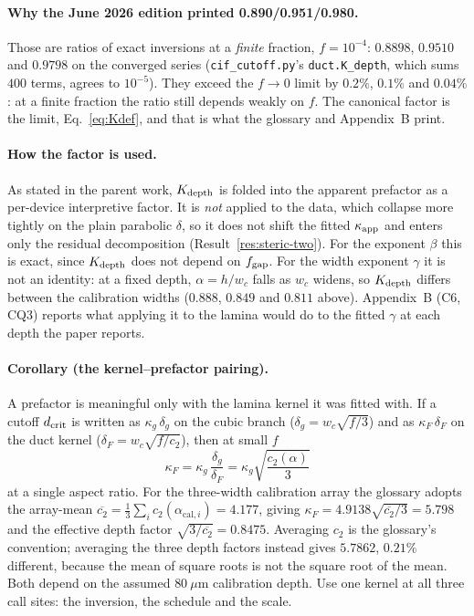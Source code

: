 \paragraph{Why the June 2026 edition printed 0.890/0.951/0.980.} Those are ratios of exact
inversions at a \emph{finite} fraction, $f=10^{-4}$: $0.8898$, $0.9510$ and $0.9798$ on the
converged series (\texttt{cif\_cutoff.py}'s \texttt{duct.K\_depth}, which sums $400$ terms, agrees
to $10^{-5}$). They exceed the $f\to0$ limit by $0.2\%$, $0.1\%$ and $0.04\%$: at a finite
fraction the ratio still depends weakly on $f$. The canonical
factor is the limit, Eq.~\eqref{eq:Kdef}, and that is what the glossary and Appendix~B print.

\paragraph{How the factor is used.} As stated in the parent work, $K_{\mathrm{depth}}$ is folded into the
apparent prefactor as a per-device interpretive factor. It is \emph{not} applied to the data,
which collapse more tightly on the plain parabolic $\delta$, so it does not shift the fitted
$\kappa_{\mathrm{app}}$ and enters only the residual decomposition (Result~\ref{res:steric-two}). For the
exponent $\beta$ this is exact, since $K_{\mathrm{depth}}$ does not depend on $f_{\mathrm{gap}}$. For the width
exponent $\gamma$ it is not an identity: at a fixed depth, $\alpha=h/w_c$ falls as $w_c$ widens,
so $K_{\mathrm{depth}}$ differs between the calibration widths ($0.888$, $0.849$ and $0.811$ above).
Appendix~B (C6, CQ3) reports what applying it to the lamina would do to the fitted $\gamma$ at
each depth the paper reports.

\paragraph{Corollary (the kernel--prefactor pairing).} A prefactor is meaningful only with the
lamina kernel it was fitted with. If a cutoff $d_{\mathrm{crit}}$ is written as
$\kappa_g\,\delta_g$ on the cubic branch ($\delta_g=w_c\sqrt{f/3}$) and as $\kappa_F\,\delta_F$
on the duct kernel ($\delta_F=w_c\sqrt{f/c_2}$), then at small $f$
\begin{equation}
\kappa_F=\kappa_g\,\frac{\delta_g}{\delta_F}=\kappa_g\sqrt{\frac{c_2(\alpha)}{3}}
\end{equation}
at a single aspect ratio. For the three-width calibration array the glossary adopts the
array-mean $\overline{c_2}=\tfrac13\sum_i c_2(\alpha_{\mathrm{cal},i})=4.177$, giving
$\kappa_F=4.9138\sqrt{\overline{c_2}/3}=5.798$ and the effective depth factor
$\sqrt{3/\overline{c_2}}=0.8475$. Averaging $c_2$ is the glossary's convention; averaging the three
depth factors instead gives $5.7862$, $0.21\%$ different, because the mean of square roots is
not the square root of the mean. Both depend on the assumed $80~\mu$m calibration depth. Use one
kernel at all three call sites: the inversion, the schedule and the scale.

